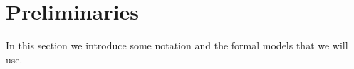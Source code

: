 \section{Preliminaries}\label{Preliminaries}

In this section we introduce some notation and the formal models that we will 
use.





